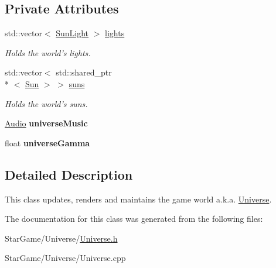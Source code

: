 \subsection*{Private Attributes}
\begin{DoxyCompactItemize}
\item 
\hypertarget{class_universe_a48a408b8a01b50f05df5fc20ae2e99a8}{std\-::vector$<$ \hyperlink{class_sun_light}{Sun\-Light} $>$ \hyperlink{class_universe_a48a408b8a01b50f05df5fc20ae2e99a8}{lights}}\label{class_universe_a48a408b8a01b50f05df5fc20ae2e99a8}

\begin{DoxyCompactList}\small\item\em Holds the world's lights. \end{DoxyCompactList}\item 
\hypertarget{class_universe_a958fd8a9e69878b1ae4526ab692ada9e}{std\-::vector$<$ std\-::shared\-\_\-ptr\\*
$<$ \hyperlink{class_sun}{Sun} $>$ $>$ \hyperlink{class_universe_a958fd8a9e69878b1ae4526ab692ada9e}{suns}}\label{class_universe_a958fd8a9e69878b1ae4526ab692ada9e}

\begin{DoxyCompactList}\small\item\em Holds the world's suns. \end{DoxyCompactList}\item 
\hypertarget{class_universe_a46f9c6d342e35cb41c8c569ccb365c5f}{\hyperlink{class_audio}{Audio} {\bfseries universe\-Music}}\label{class_universe_a46f9c6d342e35cb41c8c569ccb365c5f}

\item 
\hypertarget{class_universe_a7b067d89bf5840b737b29d267fdeade8}{float {\bfseries universe\-Gamma}}\label{class_universe_a7b067d89bf5840b737b29d267fdeade8}

\end{DoxyCompactItemize}


\subsection{Detailed Description}
This class updates, renders and maintains the game world a.\-k.\-a. \hyperlink{class_universe}{Universe}. 

The documentation for this class was generated from the following files\-:\begin{DoxyCompactItemize}
\item 
Star\-Game/\-Universe/\hyperlink{_universe_8h}{Universe.\-h}\item 
Star\-Game/\-Universe/Universe.\-cpp\end{DoxyCompactItemize}
